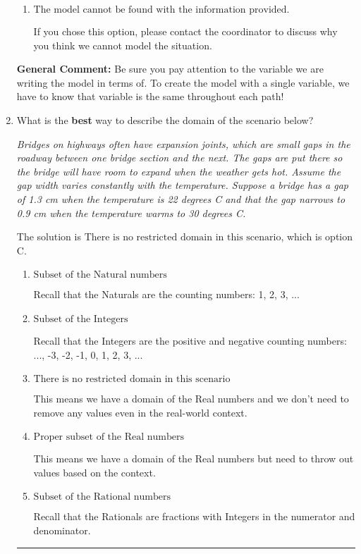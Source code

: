 \documentclass{extbook}[14pt]
\newcommand{\litem}[1]{\item #1

\rule{\textwidth}{0.4pt}}
\begin{document}
\begin{enumerate}
{\begin{enumerate}[label=\Alph*.]
Since the time spent on each path was equal, we can treat all time variables as the same variable, $t$.
\item \( \text{The model cannot be found with the information provided.} \)

If you chose this option, please contact the coordinator to discuss why you think we cannot model the situation.
\end{enumerate}

\textbf{General Comment:} Be sure you pay attention to the variable we are writing the model in terms of. To create the model with a single variable, we have to know that variable is the same throughout each path!
}
\litem{
What is the \textbf{best} way to describe the domain of the scenario below?

\begin{center}
    \textit{ Bridges on highways often have expansion joints, which are small gaps in the roadway between one bridge section and the next. The gaps are put there so the bridge will have room to expand when the weather gets hot. Assume the gap width varies constantly with the temperature. Suppose a bridge has a gap of 1.3 cm when the temperature is 22 degrees C and that the gap narrows to 0.9 cm when the temperature warms to 30 degrees C. }
\end{center}
The solution is \( \text{There is no restricted domain in this scenario} \), which is option C.\begin{enumerate}[label=\Alph*.]
\item \( \text{Subset of the Natural numbers} \)

Recall that the Naturals are the counting numbers: 1, 2, 3, ...
\item \( \text{Subset of the Integers} \)

Recall that the Integers are the positive and negative counting numbers: ..., -3, -2, -1, 0, 1, 2, 3, ... 
\item \( \text{There is no restricted domain in this scenario} \)

This means we have a domain of the Real numbers and we don't need to remove any values even in the real-world context.
\item \( \text{Proper subset of the Real numbers} \)

This means we have a domain of the Real numbers but need to throw out values based on the context.
\item \( \text{Subset of the Rational numbers} \)

Recall that the Rationals are fractions with Integers in the numerator and denominator.
\end{enumerate}

}
\end{enumerate}
\end{document}
